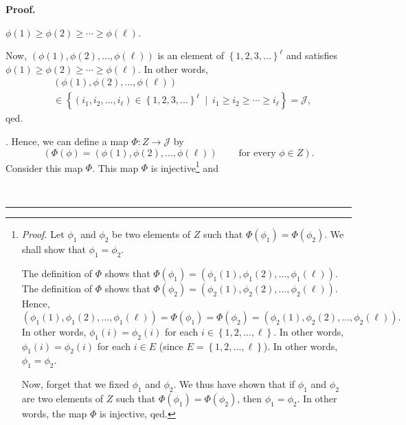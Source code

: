 \documentclass[numbers=enddot,12pt,final,onecolumn,notitlepage,abstracton]{scrartcl}
\theoremstyle{definition}
\newenvironment{proof}[1][Proof]{\noindent\textbf{#1.} }{\ \rule{0.5em}{0.5em}}
\newenvironment{verlong}{}{}
\begin{document}
\begin{verlong}
\begin{footnotesize}
\begin{proof}
{$\phi\left(  1\right)  \geq\phi\left(  2\right)  \geq\cdots\geq\phi\left(
\ell\right)  $.
\par
Now, $\left(  \phi\left(  1\right)  ,\phi\left(  2\right)  ,\ldots,\phi\left(
\ell\right)  \right)  $ is an element of $\left\{  1,2,3,\ldots\right\}
^{\ell}$ and satisfies $\phi\left(  1\right)  \geq\phi\left(  2\right)
\geq\cdots\geq\phi\left(  \ell\right)  $. In other words,%
\begin{align*}
&  \left(  \phi\left(  1\right)  ,\phi\left(  2\right)  ,\ldots,\phi\left(
\ell\right)  \right) \\
&  \in\left\{  \left(  i_{1},i_{2},\ldots,i_{\ell}\right)  \in\left\{
1,2,3,\ldots\right\}  ^{\ell}\ \mid\ i_{1}\geq i_{2}\geq\cdots\geq i_{\ell
}\right\}  =\mathcal{J},
\end{align*}
qed.}. Hence, we can define a map $\Phi:Z\rightarrow\mathcal{J}$ by%
\[
\left(  \Phi\left(  \phi\right)  =\left(  \phi\left(  1\right)  ,\phi\left(
2\right)  ,\ldots,\phi\left(  \ell\right)  \right)
\ \ \ \ \ \ \ \ \ \ \text{for every }\phi\in Z\right)  .
\]
Consider this map $\Phi$. This map $\Phi$ is
injective\footnote{\textit{Proof.} Let $\phi_{1}$ and $\phi_{2}$ be two
elements of $Z$ such that $\Phi\left(  \phi_{1}\right)  =\Phi\left(  \phi
_{2}\right)  $. We shall show that $\phi_{1}=\phi_{2}$.
\par
The definition of $\Phi$ shows that $\Phi\left(  \phi_{1}\right)  =\left(
\phi_{1}\left(  1\right)  ,\phi_{1}\left(  2\right)  ,\ldots,\phi_{1}\left(
\ell\right)  \right)  $. The definition of $\Phi$ shows that $\Phi\left(
\phi_{2}\right)  =\left(  \phi_{2}\left(  1\right)  ,\phi_{2}\left(  2\right)
,\ldots,\phi_{2}\left(  \ell\right)  \right)  $. Hence,%
\[
\left(  \phi_{1}\left(  1\right)  ,\phi_{1}\left(  2\right)  ,\ldots,\phi
_{1}\left(  \ell\right)  \right)  =\Phi\left(  \phi_{1}\right)  =\Phi\left(
\phi_{2}\right)  =\left(  \phi_{2}\left(  1\right)  ,\phi_{2}\left(  2\right)
,\ldots,\phi_{2}\left(  \ell\right)  \right)  .
\]
In other words, $\phi_{1}\left(  i\right)  =\phi_{2}\left(  i\right)  $ for
each $i\in\left\{  1,2,\ldots,\ell\right\}  $. In other words, $\phi
_{1}\left(  i\right)  =\phi_{2}\left(  i\right)  $ for each $i\in E$ (since
$E=\left\{  1,2,\ldots,\ell\right\}  $). In other words, $\phi_{1}=\phi_{2}$.
\par
Now, forget that we fixed $\phi_{1}$ and $\phi_{2}$. We thus have shown that
if $\phi_{1}$ and $\phi_{2}$ are two elements of $Z$ such that $\Phi\left(
\phi_{1}\right)  =\Phi\left(  \phi_{2}\right)  $, then $\phi_{1}=\phi_{2}$. In
other words, the map $\Phi$ is injective, qed.} and

\end{proof}
\end{footnotesize}
\end{verlong}
\end{document}
